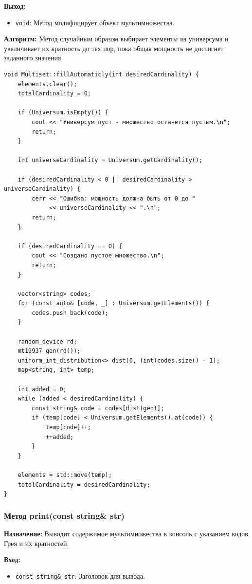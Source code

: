 \textbf{Выход:}
\begin{itemize}
    \item \texttt{void}: Метод модифицирует объект мультимножества.
\end{itemize}

\textbf{Алгоритм:} Метод случайным образом выбирает элементы из универсума и увеличивает их кратность до тех пор, пока общая мощность не достигнет заданного значения.

\begin{lstlisting}[style=cstyle, caption={Реализация fillAutomaticly()}]
void Multiset::fillAutomaticly(int desiredCardinality) {
    elements.clear();
    totalCardinality = 0;

    if (Universum.isEmpty()) {
        cout << "Универсум пуст - множество останется пустым.\n";
        return;
    }

    int universeCardinality = Universum.getCardinality();

    if (desiredCardinality < 0 || desiredCardinality > universeCardinality) {
        cerr << "Ошибка: мощность должна быть от 0 до "
             << universeCardinality << ".\n";
        return;
    }

    if (desiredCardinality == 0) {
        cout << "Создано пустое множество.\n";
        return;
    }

    vector<string> codes;
    for (const auto& [code, _] : Universum.getElements()) {
        codes.push_back(code);
    }

    random_device rd;
    mt19937 gen(rd());
    uniform_int_distribution<> dist(0, (int)codes.size() - 1);
    map<string, int> temp;

    int added = 0;
    while (added < desiredCardinality) {
        const string& code = codes[dist(gen)];
        if (temp[code] < Universum.getElements().at(code)) {
            temp[code]++;
            ++added;
        }
    }

    elements = std::move(temp);
    totalCardinality = desiredCardinality;
}
\end{lstlisting}

\subsubsection{Метод print(const string\& str)}

\textbf{Назначение:} Выводит содержимое мультимножества в консоль с указанием кодов Грея и их кратностей.

\textbf{Вход:}
\begin{itemize}
    \item \texttt{const string\& str}: Заголовок для вывода.
\end{itemize}

